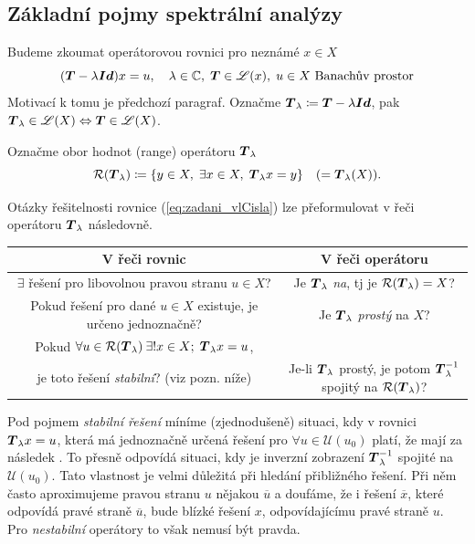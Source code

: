 \subsection{Základní pojmy spektrální analýzy}

Budeme zkoumat operátorovou rovnici pro neznámé $x\in X$
\begin{equation}
    ( \boldsymbol{T} -\lambda \boldsymbol{Id})x=u, \quad \lambda\in \mathbb{C},\;  \boldsymbol{T} \in \mathscr{L}(x),\;u\in X \text{ Banachův prostor}
    \label{eq:zadani_vlCisla}
\end{equation}
Motivací k tomu je předchozí paragraf. Označme $ \boldsymbol{T}_\lambda\coloneqq  \boldsymbol{T} -\lambda\boldsymbol{Id}$, pak $ \boldsymbol{T}_\lambda\in \mathscr{L}(X)\Leftrightarrow  \boldsymbol{T} \in \mathscr{L}(X)$.

Označme obor hodnot (range) operátoru $ \boldsymbol{T}_\lambda$
$$ \mathcal{R}( \boldsymbol{T}_\lambda)\coloneqq \{y\in X,\; \exists x\in X,\; \boldsymbol{T}_\lambda x=y\}\quad (= \boldsymbol{T}_\lambda (X)).$$

Otázky řešitelnosti rovnice (\ref{eq:zadani_vlCisla}) lze přeformulovat v řeči operátoru $ \boldsymbol{T}_\lambda$ následovně.
\begin{table}[h!]
    \centering
    \begin{tabular}{c|c}
         V řeči rovnic& V řeči operátoru  \\ \hline\hline
         $\exists$ řešení pro libovolnou pravou stranu $u\in X$? & Je $ \boldsymbol{T}_\lambda$ \emph{na}, tj je $ \mathcal{R}( \boldsymbol{T}_\lambda)=X$?\\ \hline
         Pokud řešení pro dané $u\in X$ existuje, je určeno jednoznačně? & Je $ \boldsymbol{T}_\lambda$ \emph{prostý} na $X$?\\ \hline
         Pokud $\forall u \in \mathcal{R}( \boldsymbol{T}_\lambda)\:\exists! x\in X;\;  \boldsymbol{T}_\lambda x=u$, \\je toto řešení \emph{stabilní}? (viz pozn. níže)& Je-li $ \boldsymbol{T}_\lambda$ prostý, je potom $ \boldsymbol{T}_\lambda^{-1}$ spojitý na $\mathcal{R}( \boldsymbol{T}_\lambda)$?
    \end{tabular}
\end{table}

\begin{remark}
Pod pojmem \emph{stabilní řešení} míníme (zjednodušeně) situaci, kdy v rovnici $ \boldsymbol{T}_\lambda x=u$, která má jednoznačně určená řešení pro $\forall u\in \mathcal{U}(u_0)$ platí, že  mají za následek . To přesně odpovídá situaci, kdy je inverzní zobrazení $ \boldsymbol{T}_\lambda^{-1}$ spojité na $\mathcal{U}(u_0)$. Tato vlastnost je velmi důležitá při hledání přibližného řešení. Při něm často aproximujeme pravou stranu $u$ nějakou  $\overline{u}$ a doufáme, že i řešení $\overline{x}$, které odpovídá pravé straně $\overline{u}$, bude blízké řešení $x$, odpovídajícímu pravé straně $u$. Pro \emph{nestabilní} operátory to však nemusí být pravda.
\end{remark}

